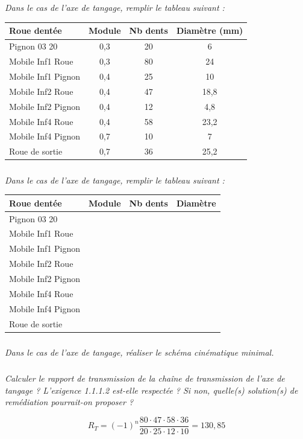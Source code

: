 \documentclass[10pt,fleqn]{article} %
\begin{document}
\begin{multicols}{2}
\ifprof
\subparagraph{}
\textit{Dans le cas de l'axe de tangage, remplir le tableau suivant :}
\begin{corrige}
\begin{center}
\begin{tabular}{|l|c|c|c|}
\hline
Roue dentée & Module & Nb dents & Diamètre (mm)\\
\hline
Pignon 03 20 & 0,3 &20        & 6		\\ \hline
Mobile Inf1 Roue & 0,3 & 80  & 24 	\\ \hline 
Mobile Inf1 Pignon & 0,4 & 25 & 10	\\ \hline
Mobile Inf2 Roue & 0,4 & 47   & 18,8	\\ \hline
Mobile Inf2 Pignon & 0,4 & 12 & 4,8	\\ \hline
Mobile Inf4 Roue & 0,4 & 58   & 23,2	\\ \hline
Mobile Inf4 Pignon & 0,7 & 10 & 7	\\ \hline
Roue de sortie & 0,7 & 36      & 25,2 \\ \hline
\end{tabular}
\end{center}
\end{corrige}

\else
\subparagraph{}
\textit{Dans le cas de l'axe de tangage, remplir le tableau suivant :}
\begin{center}
\begin{tabular}{|l|c|c|c|}
\hline
Roue dentée & Module & Nb dents & Diamètre \\
\hline
Pignon 03 20 & && \\ 
\hline
Mobile Inf1 Roue & && \\ 
\hline
Mobile Inf1 Pignon & && \\ 
\hline
Mobile Inf2 Roue & && \\ 
\hline
Mobile Inf2 Pignon & && \\ 
\hline
Mobile Inf4 Roue & && \\ 
\hline
Mobile Inf4 Pignon & && \\ 
\hline
Roue de sortie & && \\
\hline
\end{tabular}
\end{center}
\fi


\subparagraph{}
\textit{Dans le cas de l'axe de tangage, réaliser le schéma cinématique minimal.}
\ifprof
\begin{corrige}
\end{corrige}
\else
\fi

\subparagraph{}
\textit{Calculer le rapport de transmission de la chaîne de transmission de l'axe de tangage ? L'exigence 1.1.1.2 est-elle respectée ? Si non, quelle(s) solution(s) de remédiation pourrait-on proposer ?}
\ifprof
\begin{corrige}
$$
R_T = (-1)^n \dfrac{80\cdot 47 \cdot 58 \cdot 36}{20\cdot 25\cdot 12 \cdot 10 } = 130,85
$$


\end{corrige}
\end{multicols}
\end{document}
